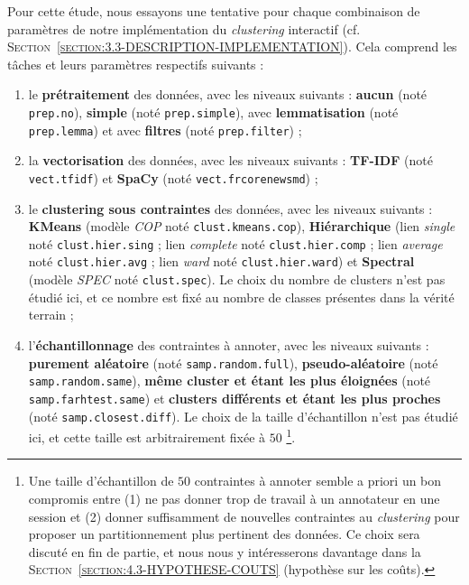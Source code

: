 			Pour cette étude, nous essayons une tentative pour chaque combinaison de paramètres de notre implémentation du \textit{clustering} interactif (cf. \textsc{Section~\ref{section:3.3-DESCRIPTION-IMPLEMENTATION}}). Cela comprend les tâches et leurs paramètres respectifs suivants :
			\begin{enumerate}
				\item le \textbf{prétraitement} des données, avec les niveaux suivants : \textbf{aucun} (noté \texttt{prep.no}), \textbf{simple} (noté \texttt{prep.simple}), avec \textbf{lemmatisation} (noté \texttt{prep.lemma}) et avec \textbf{filtres} (noté \texttt{prep.filter}) ;
				\item la \textbf{vectorisation} des données, avec les niveaux suivants : \textbf{TF-IDF} (noté \texttt{vect.tfidf}) et \textbf{SpaCy} (noté \texttt{vect.frcorenewsmd}) ;
				\item le \textbf{clustering sous contraintes} des données, avec les niveaux suivants : \textbf{KMeans} (modèle \textit{COP} noté \texttt{clust.kmeans.cop}), \textbf{Hiérarchique} (lien \textit{single} noté \texttt{clust.hier.sing} ; lien \textit{complete} noté \texttt{clust.hier.comp} ; lien \textit{average} noté \texttt{clust.hier.avg} ; lien \textit{ward} noté \texttt{clust.hier.ward}) et \textbf{Spectral} (modèle \textit{SPEC} noté \texttt{clust.spec}). Le choix du nombre de clusters n'est pas étudié ici, et ce nombre est fixé au nombre de classes présentes dans la vérité terrain ;
				\item l'\textbf{échantillonnage} des contraintes à annoter, avec les niveaux suivants : \textbf{purement aléatoire} (noté \texttt{samp.random.full}), \textbf{pseudo-aléatoire} (noté \texttt{samp.random.same}), \textbf{même cluster et étant les plus éloignées} (noté \texttt{samp.farhtest.same}) et \textbf{clusters différents et étant les plus proches} (noté \texttt{samp.closest.diff}). Le choix de la taille d'échantillon n'est pas étudié ici, et cette taille est arbitrairement fixée à $50$
				\footnote{Une taille d'échantillon de $50$ contraintes à annoter semble a priori un bon compromis entre (1) ne pas donner trop de travail à un annotateur en une session et (2) donner suffisamment de nouvelles contraintes au \textit{clustering} pour proposer un partitionnement plus pertinent des données. Ce choix sera discuté en fin de partie, et nous nous y intéresserons davantage dans la \textsc{Section~\ref{section:4.3-HYPOTHESE-COUTS}} (hypothèse sur les coûts).}.
			\end{enumerate}
			
